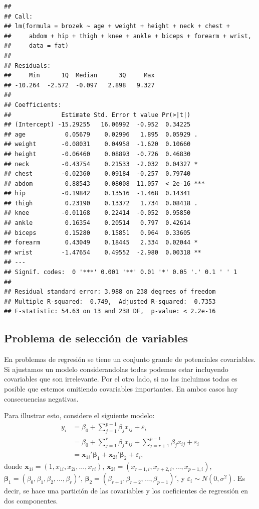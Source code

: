\documentclass[
]{article}
\begin{document}
\begin{verbatim}
## 
## Call:
## lm(formula = brozek ~ age + weight + height + neck + chest + 
##     abdom + hip + thigh + knee + ankle + biceps + forearm + wrist, 
##     data = fat)
## 
## Residuals:
##     Min      1Q  Median      3Q     Max 
## -10.264  -2.572  -0.097   2.898   9.327 
## 
## Coefficients:
##              Estimate Std. Error t value Pr(>|t|)    
## (Intercept) -15.29255   16.06992  -0.952  0.34225    
## age           0.05679    0.02996   1.895  0.05929 .  
## weight       -0.08031    0.04958  -1.620  0.10660    
## height       -0.06460    0.08893  -0.726  0.46830    
## neck         -0.43754    0.21533  -2.032  0.04327 *  
## chest        -0.02360    0.09184  -0.257  0.79740    
## abdom         0.88543    0.08008  11.057  < 2e-16 ***
## hip          -0.19842    0.13516  -1.468  0.14341    
## thigh         0.23190    0.13372   1.734  0.08418 .  
## knee         -0.01168    0.22414  -0.052  0.95850    
## ankle         0.16354    0.20514   0.797  0.42614    
## biceps        0.15280    0.15851   0.964  0.33605    
## forearm       0.43049    0.18445   2.334  0.02044 *  
## wrist        -1.47654    0.49552  -2.980  0.00318 ** 
## ---
## Signif. codes:  0 '***' 0.001 '**' 0.01 '*' 0.05 '.' 0.1 ' ' 1
## 
## Residual standard error: 3.988 on 238 degrees of freedom
## Multiple R-squared:  0.749,  Adjusted R-squared:  0.7353 
## F-statistic: 54.63 on 13 and 238 DF,  p-value: < 2.2e-16
\end{verbatim}

\hypertarget{problema-de-selecciuxf3n-de-variables}{%
\subsection{Problema de selección de variables}\label{problema-de-selecciuxf3n-de-variables}}

En problemas de regresión se tiene un conjunto grande de potenciales covariables. Si ajustamos un modelo considerandolas todas podemos estar incluyendo covariables que son irrelevante. Por el otro lado, si no las incluimos todas es posible que estemos omitiendo covariables importantes. En ambos casos hay consecuencias negativas.

Para illustrar esto, considere el siguiente modelo:
\begin{equation}
\begin{split}
y_{i} &= \beta_{0} + \sum_{j=1}^{p-1}\beta_{j}x_{ij} + \varepsilon_{i} \\
&= \beta_{0} + \sum_{j=1}^{r}\beta_{j}x_{ij} + \sum_{j=r+1}^{p-1}\beta_{j}x_{ij} + \varepsilon_{i} \\
&= \boldsymbol x_{1i}'\boldsymbol \beta_1 + \boldsymbol x_{2i}'\boldsymbol \beta_2 + \varepsilon_i,
\end{split}
\label{eq:modelogral}
\end{equation}
donde \(\boldsymbol x_{1i} = (1,x_{1i},x_{2i},\ldots,x_{ri})\), \(\boldsymbol x_{2i} = (x_{r+1,i},x_{r+2,i},\ldots,x_{p-1,i})\), \(\boldsymbol \beta_1 = (\beta_0,\beta_1,\beta_2,\ldots,\beta_r)'\), \(\boldsymbol \beta_2 = (\beta_{r+1},\beta_{r+2},\ldots,\beta_{p-1})'\), y \(\varepsilon_i \sim N(0,\sigma^{2})\). Es decir, se hace una partición de las covariables y los coeficientes de regressión en dos componentes.
\end{document}
